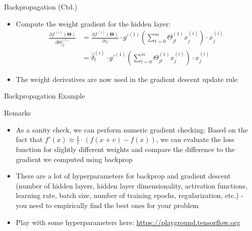 \begin{frame}{Backpropagation (Ctd.)}{}\important
	\begin{itemize}
		\item Compute the weight gradient for the hidden layer:
		\begin{align*}
			\frac{\partial \mathcal{J}^{(i)}(\bm{\Theta})}{\partial \Theta_{lj}^{(1)}}
				&= \frac{\partial \mathcal{J}^{(i)}(\bm{\Theta})}{\partial z_l} \cdot g'^{(1)} \left( \sum_{t=0}^m \Theta_{jt}^{(1)} x_j^{(i)} \right) \cdot x_j^{(i)} \\
				&= \widehat{\delta}_l^{(i)} \cdot g'^{(1)} \left( \sum_{t=0}^m \Theta_{jt}^{(1)} x_j^{(i)} \right) \cdot x_j^{(i)}
		\end{align*}
		\item The weight derivatives are now used in the gradient descent update rule
	\end{itemize}
\end{frame}


\begin{frame}{Backpropagation Example}{}
	
\end{frame}

\begin{frame}{Remarks}{}
	\begin{itemize}
		\item As a sanity check, we can perform numeric gradient checking: Based on the fact that $f'(x) \approx \frac{1}{v} \cdot (f(x + v) - f(x))$, we can evaluate the loss function for slightly different weights and compare the difference to the gradient we computed using backprop
		\item There are a lot of hyperparameters for backprop and gradient descent (number of hidden layers, hidden layer dimensionality, activation functions, learning rate, batch size, number of training epochs, regularization, etc.) - you need to empirically find the best ones for your problem
		\item Play with some hyperparameters here: \url{https://playground.tensorflow.org}
	\end{itemize}
\end{frame}

